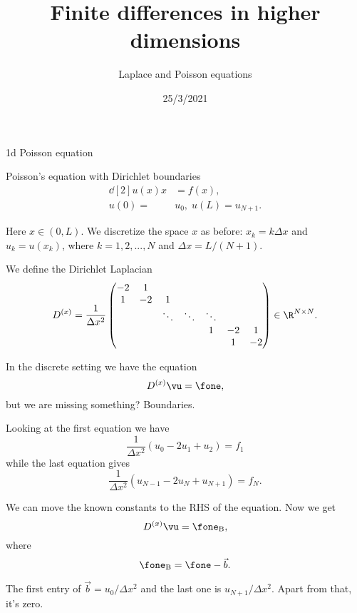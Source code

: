 

\title{Finite differences in higher dimensions}
\subtitle{Laplace and Poisson equations}
\date{25/3/2021}
\date{}


	
	\maketitle
	

\begin{frame}{1d Poisson equation}
	\begin{block}{\centering Poisson's equation with Dirichlet boundaries}
		\begin{align*}
			\dd[2]{u(x)}{x} &= f(x), \\
			u(0) = &u_0, \; u(L) = u_{N+1}.
		\end{align*}
	\end{block}	

Here $ x \in (0,L) $. We discretize the space $ x $ as before: $ x_k = k \Delta x  $ and $ u_k = u(x_k) $, where $ k = 1,2,...,N $ and $ \Delta x = L/(N+1) $. 

We define the Dirichlet Laplacian
\[ D^{(x)} = \frac{1}{\Delta x^2} \begin{pmatrix}
	-2 & 1 &  &   & &  &  \\
	1 & -2 & 1  &   & &  &  \\
	& & \ddots & \ddots & \ddots  & & \\
	& & & & 1 & -2 & 1 \\
	& & & & & 1 & -2 \\
\end{pmatrix} \in \R^{N \times N}. \]
\end{frame}

\begin{frame}
	In the discrete setting we have the equation
	\[ D^{(x)} \vu  = \fone, \]
	but we are missing something? \pause Boundaries.
	
	\pause
	Looking at the first equation we have 
	\[ \frac{1}{\Delta x^2}(u_0 - 2 u_1 + u_2) = f_1 \]
	while the last equation gives
	\[ \frac{1}{\Delta x^2}(u_{N-1} - 2 u_{N} + u_{N+1}) = f_N. \]
	
	\pause
	We can move the known constants to the RHS of the equation. Now we get 
	\[ D^{(x)} \vu  = \fone_\text{B}, \]
	where 
	\[ \fone_\text{B} = \fone - \vec{b}. \]
	
	\pause
	The first entry of $ \vec{b} = u_0/\Delta x^2 $ and the last one is $ u_{N+1}/\Delta x^2 $. Apart from that, it's zero.
\end{frame}

